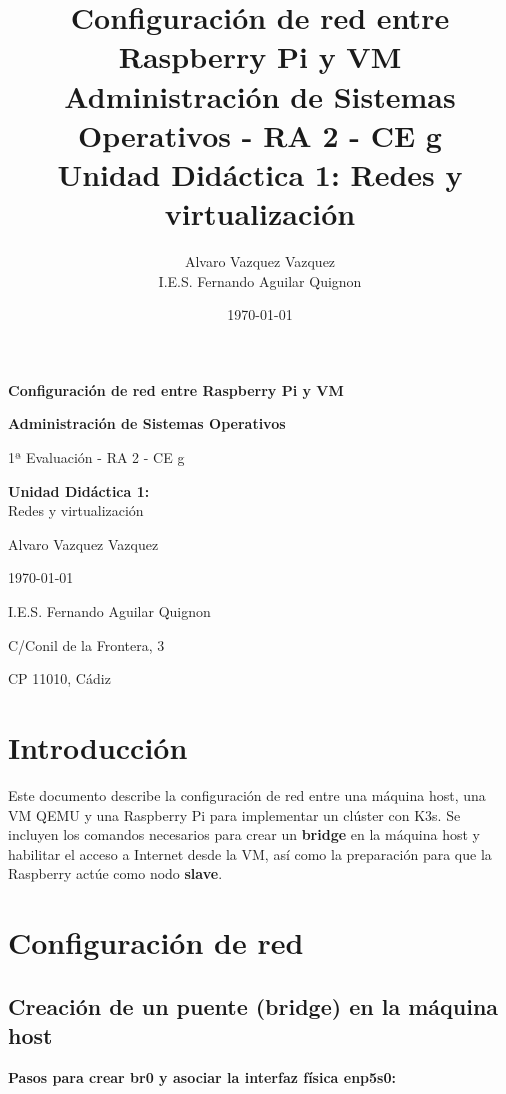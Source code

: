 \documentclass[12pt, a4paper]{article}
\title{\textbf{Configuración de red entre Raspberry Pi y VM} \\
\large Administración de Sistemas Operativos - RA 2 - CE g \\
Unidad Didáctica 1: Redes y virtualización}
\author{Alvaro Vazquez Vazquez \\ I.E.S. Fernando Aguilar Quignon}
\date{\today}
\begin{document}
\begin{titlepage}
    \centering
    \vspace*{2cm}
    {\Huge \textbf{Configuración de red entre Raspberry Pi y VM} \par}
    \vspace{0.5cm}
    {\Large \textbf{Administración de Sistemas Operativos} \par}
    \vspace{0.5cm}
    {\large 1ª Evaluación - RA 2 - CE g \par}
    \vspace{1cm}
    {\large \textbf{Unidad Didáctica 1:} \\ Redes y virtualización \par}
    \vspace{2cm}
    {\Large Alvaro Vazquez Vazquez \par}
    \vspace{0.5cm}
    {\large \today \par}
    \vspace{2cm}
    \vfill
    {\large I.E.S. Fernando Aguilar Quignon \par}
    {\small C/Conil de la Frontera, 3 \par}
    {\small CP 11010, Cádiz \par}
\end{titlepage}

\tableofcontents
\clearpage

\section{Introducción}
Este documento describe la configuración de red entre una máquina host, una VM QEMU y una Raspberry Pi para implementar un clúster con K3s. Se incluyen los comandos necesarios para crear un \textbf{bridge} en la máquina host y habilitar el acceso a Internet desde la VM, así como la preparación para que la Raspberry actúe como nodo \textbf{slave}.

\section{Configuración de red}

\subsection{Creación de un puente (bridge) en la máquina host}

\textbf{Pasos para crear br0 y asociar la interfaz física enp5s0:}
\end{document}
